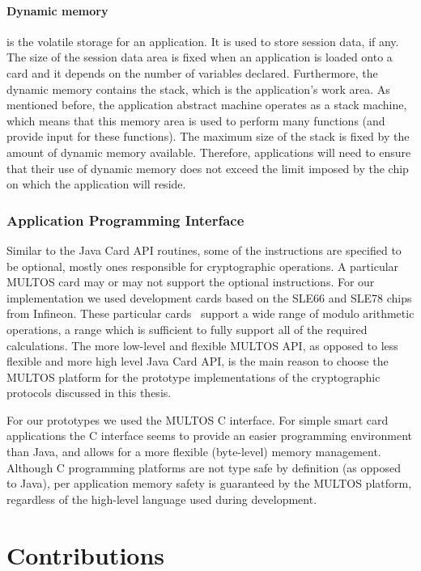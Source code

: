 \paragraph{Dynamic memory} is the volatile storage for an application. It is
used to store session data, if any. The size of the session data area is fixed
when an application is loaded onto a card and it depends on the number of
variables declared. Furthermore, the dynamic memory contains the stack, which
is the application's work area. As mentioned before, the application abstract
machine operates as a stack machine, which means that this memory area is used
to perform many functions (and provide input for these functions). The maximum
size of the stack is fixed by the amount of dynamic memory available. Therefore,
applications will need to ensure that their use of dynamic memory does not
exceed the limit imposed by the chip~\cite{MIR2012} on which the application
will reside.

\subsubsection{Application Programming Interface}

Similar to the Java Card API routines, some of the instructions are specified to
be optional, mostly ones responsible for cryptographic operations. A particular
MULTOS card may or may not support the optional instructions. For our
implementation we used development cards based on the SLE66 and SLE78 chips from
Infineon. These particular cards~\cite{MULTOS_Implementation2010} support a wide
range of modulo arithmetic operations, a range which is sufficient to fully
support all of the required calculations. The more low-level and flexible MULTOS
API, as opposed to less flexible and more high level Java Card API, is the main
reason to choose the MULTOS platform for the prototype implementations of the
cryptographic protocols discussed in this thesis.

For our prototypes we used the MULTOS C interface. For simple smart card
applications the C interface seems to provide an easier programming environment
than Java, and allows for a more flexible (byte-level) memory management.
Although C programming platforms are not type safe by definition (as opposed to
Java), per application memory safety is guaranteed by the MULTOS platform,
regardless of the high-level language used during development.

\section{Contributions}

